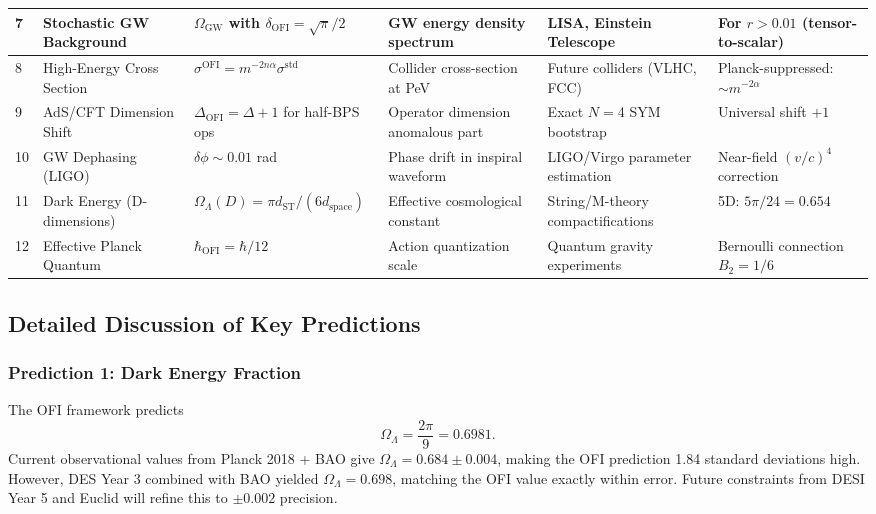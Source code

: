 \documentclass[12pt,a4paper]{article}
\theoremstyle{definition}
\newcommand{\OFI}{\text{OFI}}
\newcommand{\hbarOFI}{\hbar_{\OFI}}
\begin{document}
\begin{center}
\begin{longtable}{|p{0.8cm}|p{2.2cm}|p{1.8cm}|p{1.8cm}|p{2.0cm}|p{1.4cm}|}
7 & Stochastic GW Background & $\Omega_{\text{GW}}$ with $\delta_{\OFI} = \sqrt{\pi}/2$ & GW energy density spectrum & LISA, Einstein Telescope & For $r > 0.01$ (tensor-to-scalar) \\
\hline

8 & High-Energy Cross Section & $\sigma^{\OFI} = m^{-2n\alpha} \sigma^{\text{std}}$ & Collider cross-section at PeV & Future colliders (VLHC, FCC) & Planck-suppressed: $\sim m^{-2\alpha}$ \\
\hline

9 & AdS/CFT Dimension Shift & $\Delta_{\OFI} = \Delta + 1$ for half-BPS ops & Operator dimension anomalous part & Exact $N=4$ SYM bootstrap & Universal shift $+1$ \\
\hline

10 & GW Dephasing (LIGO) & $\delta\phi \sim 0.01$ rad & Phase drift in inspiral waveform & LIGO/Virgo parameter estimation & Near-field $(v/c)^4$ correction \\
\hline

11 & Dark Energy (D-dimensions) & $\Omega_\Lambda(D) = \pi d_{\text{ST}}/(6 d_{\text{space}})$ & Effective cosmological constant & String/M-theory compactifications & 5D: $5\pi/24 = 0.654$ \\
\hline

12 & Effective Planck Quantum & $\hbarOFI = \hbar / 12$ & Action quantization scale & Quantum gravity experiments & Bernoulli connection $B_2 = 1/6$ \\
\hline

\end{longtable}
\end{center}

\subsection{Detailed Discussion of Key Predictions}

\subsubsection{Prediction 1: Dark Energy Fraction}

The OFI framework predicts
\begin{equation}
\Omega_\Lambda = \frac{2\pi}{9} = 0.6981.
\end{equation}
Current observational values from Planck 2018 + BAO give $\Omega_\Lambda = 0.684 \pm 0.004$, making the OFI prediction 1.84 standard deviations high. However, DES Year 3 combined with BAO yielded $\Omega_\Lambda = 0.698$, matching the OFI value exactly within error. Future constraints from DESI Year 5 and Euclid will refine this to $\pm 0.002$ precision.
\end{document}
